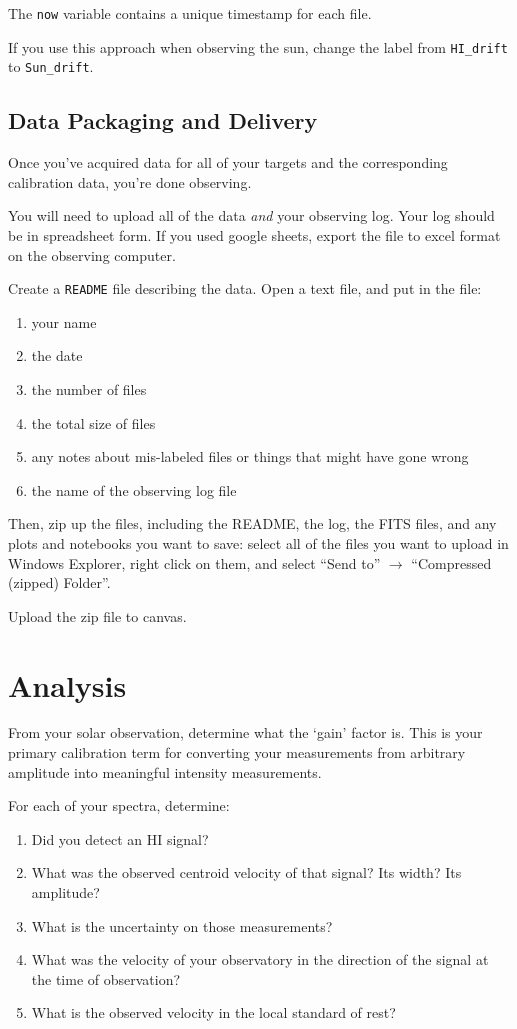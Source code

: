\documentclass[11pt]{article}
\begin{document}
The \texttt{now} variable contains a unique timestamp for each file.

If you use this approach when observing the sun, change the label from \texttt{HI\_drift} to \texttt{Sun\_drift}.



\subsection{Data Packaging and Delivery}
Once you've acquired data for all of your targets and the corresponding calibration data, you're done observing.

You will need to upload all of the data \emph{and} your observing log.
Your log should be in spreadsheet form.  If you used
google sheets, export the file to excel format on the observing computer.

Create a \texttt{README} file describing the data.  Open a text file,
and put in the file:
\begin{enumerate}
    \item your name
    \item the date
    \item the number of files
    \item the total size of files
    \item any notes about mis-labeled files or things that might have gone wrong
    \item the name of the observing log file
\end{enumerate}

Then, zip up the files, including the README, the log, the FITS files, and any plots
and notebooks you want to save:
select all of the files you want to upload in Windows Explorer, right click on
them, and select ``Send to'' $\rightarrow$ ``Compressed (zipped) Folder''.

Upload the zip file to canvas.


\section{Analysis}

From your solar observation, determine what the `gain' factor is.  This is your primary
calibration term for converting your measurements from arbitrary amplitude into meaningful
intensity measurements.


For each of your spectra, determine:
\begin{enumerate}
    \item Did you detect an HI signal?
    \item What was the observed centroid velocity of that signal?  Its width?  Its amplitude?
    \item What is the uncertainty on those measurements?
    \item What was the velocity of your observatory in the direction of the signal
        at the time of observation?
    \item What is the observed velocity in the local standard of rest?
\end{enumerate}
\end{document}
